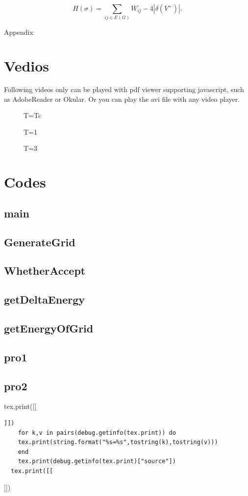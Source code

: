 \documentclass[11pt,openany]{book}              %
\begin{document}
\begin{equation}
	H(\sigma )=\sum _{ij\in E(G)}W_{ij}-4\left|\delta (V^{+})\right|.
\end{equation}
%
%
\appendix
\begin{center}
	\large Appendix
\end{center}
\section{Vedios}
Following videos only can be played with pdf viewer supporting javascript, such as AdobeReader or Okular. Or you can play the avi file with any video player.
\begin{figure}[H]
	\centering
	\caption{T=Tc}
	\label{vid:Tc}
\end{figure}
\begin{figure}[H]
	\centering
	\caption{T=1}
	\label{vid:1}
\end{figure}
\begin{figure}[H]
	\centering
	\caption{T=3}
	\label{vid:3}
\end{figure}
\section{Codes}
\newcommand{\code}[1]{\subsection{#1}}
% 
\code{main}
\code{GenerateGrid}
\code{WhetherAccept}
\code{getDeltaEnergy}
\code{getEnergyOfGrid}
\code{pro1}
\code{pro2}
\begin{luacode*}
	tex.print([[\begin{lstlisting}]])
    for k,v in pairs(debug.getinfo(tex.print)) do 
    tex.print(string.format("%s=%s",tostring(k),tostring(v)))
    end
    tex.print(debug.getinfo(tex.print)["source"])
  tex.print([[\end{lstlisting}]])
\end{luacode*}
\end{document}

